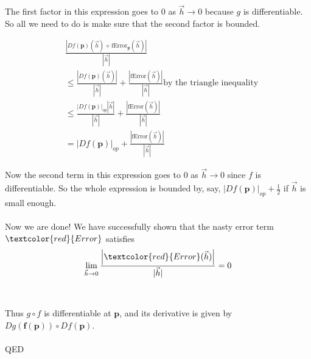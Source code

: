 \documentclass{ximera}
\begin{document}
The first factor in this expression goes to $0$ as $\vec{h} \to 0$ because $g$ is differentiable.  
So all we need to do is make sure that the second factor is bounded.

\begin{align*}
	&\frac{\left|Df(\mathbf{p})(\vec{h})+\text{fError}_{\mathbf{p}}(\vec{h})\right|}{|\vec{h}|} \\
	&\leq \frac{\left|Df(\mathbf{p})(\vec{h}) \right|}{|\vec{h}|}+ \frac{\left|\text{fError}(\vec{h})\right|}{|\vec{h}|} \text{by the triangle inequality}\\
	&\leq \frac{\left|Df(\mathbf{p})\right|_{op}\left|\vec{h}\right|}{|\vec{h}|}+ \frac{\left|\text{fError}(\vec{h})\right|}{|\vec{h}|}\\
	&= \left|Df(\mathbf{p})\right|_{op} + \frac{\left|\text{fError}(\vec{h})\right|}{|\vec{h}|}
\end{align*}

Now the second term in this expression goes to $0$ as $\vec{h} \to 0$ since $f$ is differentiable.  So the whole expression is bounded by, say, $|Df(\mathbf{p})|_{op}+\frac{1}{2}$
if $\vec{h}$ is small enough.  
\\
\\
Now we are done!  We have successfully shown that the nasty error term $\textcolor{red}{Error}$ 
satisfies \[\lim_{\vec{h} \to 0}\frac{\left|\textcolor{red}{Error}(\vec{h})\right|}{|\vec{h}|} = 0\]
\\
\\
Thus $g \circ f$ is differentiable at $\mathbf{p}$, and its derivative is given by $Dg(\mathbf{f(p)}) \circ Df(\mathbf{p})$.
\\
\\
QED


	
\end{document}

